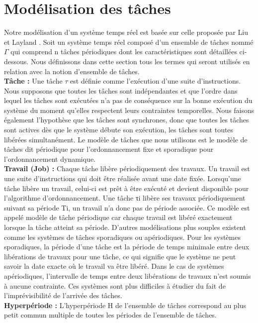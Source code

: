 \section{Modélisation des tâches}
\vspace{-1cm}
Notre modélisation d’un système temps réel est basée sur celle proposée par Liu et Layland \cite{LL73}. 
Soit un système temps réel composé d’un ensemble de tâches nommé $\Gamma$ qui comprend n tâches périodiques dont les caractéristiques sont détaillées ci-dessous. Nous définissons dans cette section tous les termes qui seront utilisés en relation avec la notion d’ensemble de tâches.
\\ \indent \textbf{Tâche :} Une tâche $\tau$ est définie comme l’exécution d’une suite d’instructions. Nous supposons que toutes les tâches sont indépendantes et que l’ordre dans lequel les tâches sont exécutées n’a pas de conséquence sur la bonne exécution du système du moment qu’elles respectent leurs contraintes temporelles. Nous faisons également l’hypothèse que les tâches sont synchrones, donc que toutes les tâches sont actives dès que le système débute son exécution, les tâches sont toutes libérées simultanément. Le modèle de tâches que nous utilisons est le modèle de tâches dit périodique pour l’ordonnancement fixe et sporadique pour l’ordonnancement dynamique.
\\ \indent \textbf{Travail (Job) :} Chaque tâche libère périodiquement des travaux. Un travail est une suite d’instructions qui doit être réalisée avant une date fixée. Lorsqu’une tâche libère un travail, celui-ci est prêt à être exécuté et devient disponible pour l’algorithme d’ordonnancement. Une tâche τi libère ses travaux périodiquement suivant sa période Ti, un travail n’a donc pas de période associée. Ce modèle est appelé modèle de tâche périodique car chaque travail est libéré exactement lorsque la tâche atteint sa période. D’autres modélisations plus souples existent comme les systèmes de tâches sporadiques ou apériodiques. Pour les systèmes sporadiques, la période d’une tâche est la période de temps minimale entre deux libérations de travaux pour une tâche, ce qui signifie que le système ne peut savoir la date exacte où le travail va être libéré. Dans le cas de systèmes apériodiques, l’intervalle de temps entre deux libérations de travaux n’est soumis à aucune contrainte. Ces systèmes sont plus diﬃciles à étudier du fait de l’imprévisibilité de l’arrivée des tâches. 
\\ \indent \textbf{Hyperpériode :} L’hyperpériode H de l’ensemble de tâches correspond au plus petit commun multiple de toutes les périodes de l’ensemble de tâches.
